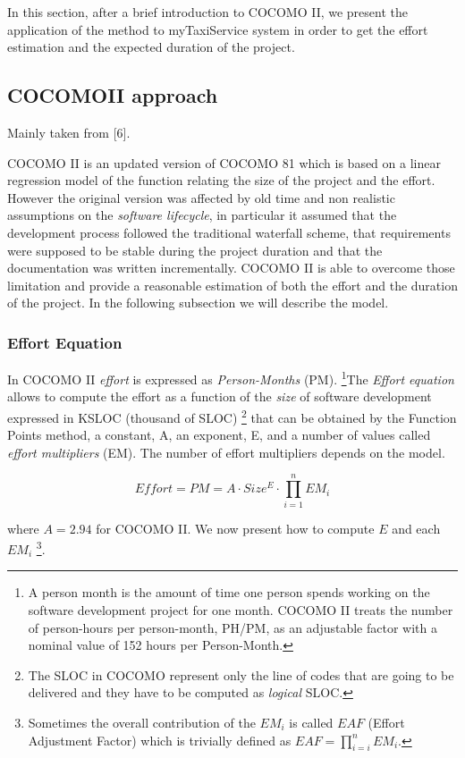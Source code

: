 In this section, after a brief introduction to COCOMO II, we present
the application of the method to myTaxiService system in order to
get the effort estimation and the expected duration of the project.


\subsection{COCOMOII approach}

Mainly taken from {[}6{]}.

COCOMO II is an updated version of COCOMO 81 which is based on a linear
regression model of the function relating the size of the project
and the effort. However the original version was affected by old time
and non realistic assumptions on the \emph{software lifecycle}, in
particular it assumed that the development process followed the traditional
waterfall scheme, that requirements were supposed to be stable during
the project duration and that the documentation was written incrementally.
COCOMO II is able to overcome those limitation and provide a reasonable
estimation of both the effort and the duration of the project. In
the following subsection we will describe the model.


\subsubsection{Effort Equation}

In COCOMO II \emph{effort} is expressed as \emph{Person-Months} (PM).
\footnote{A person month is the amount of time one person spends working on
the software development project for one month. COCOMO II treats the
number of person-hours per person-month, PH/PM, as an adjustable factor
with a nominal value of 152 hours per Person-Month.%
}The \emph{Effort equation} allows to compute the effort as a function
of the \emph{size} of software development expressed in KSLOC (thousand
of SLOC)%
\footnote{The SLOC in COCOMO represent only the line of codes that are going
to be delivered and they have to be computed as \emph{logical} SLOC.%
} that can be obtained by the Function Points method, a constant, A,
an exponent, E, and a number of values called\emph{ effort multipliers}
(EM). The number of effort multipliers depends on the model. 

\[
Effort=PM=A\cdot Size^{E}\cdot\prod_{i=1}^{n}EM_{i}
\]


where $A=2.94$ for COCOMO II. We now present how to compute $E$
and each $EM_{i}$%
\footnote{Sometimes the overall contribution of the $EM_{i}$ is called $EAF$
(Effort Adjustment Factor) which is trivially defined as $EAF=\prod_{i=i}^{n}EM_{i}$.%
}.


